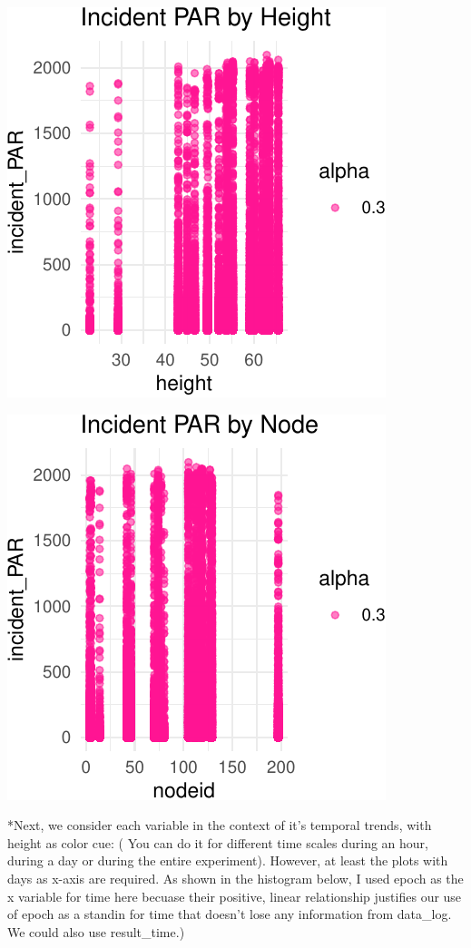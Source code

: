 \documentclass[]{article}
\begin{document}
\begin{center}\includegraphics{Project1WriteUp_files/figure-latex/unnamed-chunk-15-2} \end{center}

\begin{center}\includegraphics{Project1WriteUp_files/figure-latex/unnamed-chunk-15-3} \end{center}

*Next, we consider each variable in the context of it's temporal trends,
with height as color cue: ( You can do it for different time scales
during an hour, during a day or during the entire experiment). However,
at least the plots with days as x-axis are required. As shown in the
histogram below, I used epoch as the x variable for time here becuase
their positive, linear relationship justifies our use of epoch as a
standin for time that doesn't lose any information from data\_log. We
could also use result\_time.)
\end{document}
